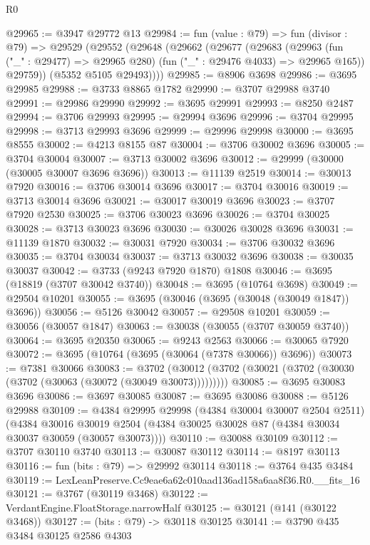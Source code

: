 \begin{lexlean}{R0}
\begin{coremodule}
@29965 := @3947 @29772 @13
@29984 := fun (value : @79) =>
  fun (divisor : @79) =>
  @29529
    (@29552
      (@29648
        (@29662
          (@29677
            (@29683
              (@29963 (fun ("_" : @29477) => @29965 @280) (fun ("_" : @29476 @4033) => @29965 @165))
              @29759))
          (@5352 @5105 @29493))))
@29985 := @8906 @3698
@29986 := @3695 @29985
@29988 := @3733 @8865 @1782
@29990 := @3707 @29988 @3740
@29991 := @29986 @29990
@29992 := @3695 @29991
@29993 := @8250 @2487
@29994 := @3706 @29993
@29995 := @29994 @3696
@29996 := @3704 @29995
@29998 := @3713 @29993 @3696
@29999 := @29996 @29998
@30000 := @3695 @8555
@30002 := @4213 @8155 @87
@30004 := @3706 @30002 @3696
@30005 := @3704 @30004
@30007 := @3713 @30002 @3696
@30012 := @29999 (@30000 (@30005 @30007 @3696 @3696))
@30013 := @11139 @2519
@30014 := @30013 @7920
@30016 := @3706 @30014 @3696
@30017 := @3704 @30016
@30019 := @3713 @30014 @3696
@30021 := @30017 @30019 @3696
@30023 := @3707 @7920 @2530
@30025 := @3706 @30023 @3696
@30026 := @3704 @30025
@30028 := @3713 @30023 @3696
@30030 := @30026 @30028 @3696
@30031 := @11139 @1870
@30032 := @30031 @7920
@30034 := @3706 @30032 @3696
@30035 := @3704 @30034
@30037 := @3713 @30032 @3696
@30038 := @30035 @30037
@30042 := @3733 (@9243 @7920 @1870) @1808
@30046 := @3695 (@18819 (@3707 @30042 @3740))
@30048 := @3695 (@10764 @3698)
@30049 := @29504 @10201
@30055 := @3695 (@30046 (@3695 (@30048 (@30049 @1847)) @3696))
@30056 := @5126 @30042
@30057 := @29508 @10201
@30059 := @30056 (@30057 @1847)
@30063 := @30038 (@30055 (@3707 @30059 @3740))
@30064 := @3695 @20350
@30065 := @9243 @2563
@30066 := @30065 @7920
@30072 := @3695 (@10764 (@3695 (@30064 (@7378 @30066)) @3696))
@30073 := @7381 @30066
@30083 := @3702 (@30012 (@3702 (@30021 (@3702 (@30030 (@3702 (@30063 (@30072 (@30049 @30073)))))))))
@30085 := @3695 @30083 @3696
@30086 := @3697 @30085
@30087 := @3695 @30086
@30088 := @5126 @29988
@30109 := @4384
    @29995
    @29998
    (@4384 @30004 @30007 @2504 @2511)
    (@4384
      @30016
      @30019
      @2504
      (@4384 @30025 @30028 @87 (@4384 @30034 @30037 @30059 (@30057 @30073))))
@30110 := @30088 @30109
@30112 := @3707 @30110 @3740
@30113 := @30087 @30112
@30114 := @8197 @30113
@30116 := fun (bits : @79) => @29992 @30114
@30118 := @3764 @435 @3484
@30119 := LexLeanPreserve.Cc9eae6a62c010aad136ad158a6aa8f36.R0.__fits_16
@30121 := @3767 (@30119 @3468)
@30122 := VerdantEngine.FloatStorage.narrowHalf
@30125 := @30121 (@141 (@30122 @3468))
@30127 := (bits : @79) -> @30118 @30125
@30141 := @3790
    @435
    @3484
    @30125
    @2586
    @4303

\end{coremodule}
\end{lexlean}
